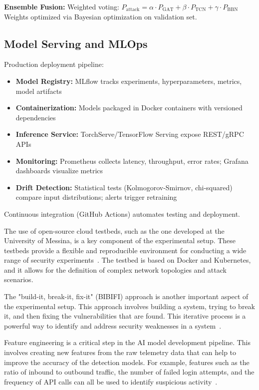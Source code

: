 \textbf{Ensemble Fusion:}
Weighted voting: $P_{\text{attack}} = \alpha \cdot P_{\text{GAT}} + \beta \cdot P_{\text{TCN}} + \gamma \cdot P_{\text{BBN}}$
Weights optimized via Bayesian optimization on validation set.

\subsection{Model Serving and MLOps}
Production deployment pipeline:
\begin{itemize}
    \item \textbf{Model Registry:} MLflow tracks experiments, hyperparameters, metrics, model artifacts
    \item \textbf{Containerization:} Models packaged in Docker containers with versioned dependencies
    \item \textbf{Inference Service:} TorchServe/TensorFlow Serving expose REST/gRPC APIs
    \item \textbf{Monitoring:} Prometheus collects latency, throughput, error rates; Grafana dashboards visualize metrics
    \item \textbf{Drift Detection:} Statistical tests (Kolmogorov-Smirnov, chi-squared) compare input distributions; alerts trigger retraining
\end{itemize}

Continuous integration (GitHub Actions) automates testing and deployment.

The use of open-source cloud testbeds, such as the one developed at the University of Messina, is a key component of the experimental setup. These testbeds provide a flexible and reproducible environment for conducting a wide range of security experiments~\cite{unime2024testbeds}. The testbed is based on Docker and Kubernetes, and it allows for the definition of complex network topologies and attack scenarios.

The "build-it, break-it, fix-it" (BIBIFI) approach is another important aspect of the experimental setup. This approach involves building a system, trying to break it, and then fixing the vulnerabilities that are found. This iterative process is a powerful way to identify and address security weaknesses in a system~\cite{youtube2024bibifi}.

Feature engineering is a critical step in the AI model development pipeline. This involves creating new features from the raw telemetry data that can help to improve the accuracy of the detection models. For example, features such as the ratio of inbound to outbound traffic, the number of failed login attempts, and the frequency of API calls can all be used to identify suspicious activity~\cite{medium2024feature}.

